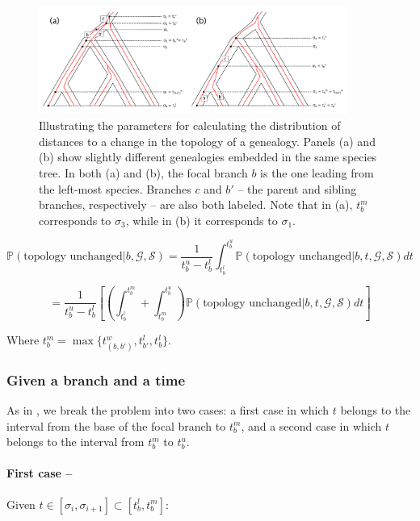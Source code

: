 \documentclass[11pt]{article}
\begin{document}
\begin{figure}
	\centering
	\includegraphics[width=0.9\textwidth]{figures/FigS1-topology_illustration.pdf}
	\caption{Illustrating the parameters for calculating the distribution of distances to a change in the topology of a genealogy. Panels (a) and (b) show slightly different genealogies embedded in the same species tree. In both (a) and (b), the focal branch $b$ is the one leading from the left-most species. Branches $c$ and $b'$ -- the parent and sibling branches, respectively -- are also both labeled. Note that in (a), $t_b^m$ corresponds to $\sigma_3$, while in (b) it corresponds to $\sigma_1$.}
\end{figure}

\begin{equation}
	\mathbb{P}(\textrm{topology unchanged} | b,\mathcal{G},\mathcal{S}) = \frac{1}{t_b^u-t_b^l}\int_{t_b^l}^{t_b^u}\mathbb{P}(\textrm{topology unchanged} | b,t,\mathcal{G},\mathcal{S})dt
\end{equation}

\begin{equation}
	= \frac{1}{t_b^u-t_b^l}\left[\left(\int_{t_b^l}^{t_b^m}+\int_{t_b^m}^{t_b^u}\right)\mathbb{P}(\textrm{topology unchanged} | b,t,\mathcal{G},\mathcal{S})dt\right]
\end{equation}

Where $t^m_b=\max\{t^w_{(b,b')},t_{b'}^l,t_b^l\}$.

\subsubsection{Given a branch and a time}

As in \citet{deng_distribution_2021}, we break the problem into two cases: a first case in which $t$ belongs to the interval from the base of the focal branch to $t^m_b$, and a second case in which $t$ belongs to the interval from $t^m_b$ to $t^u_b$. 

\paragraph{First case --} Given $t \in [\sigma_i, \sigma_{i+1}] \subset [t_b^l,t_{b}^m]$:
\end{document}
